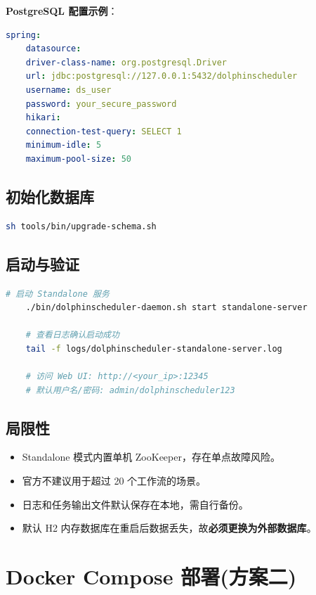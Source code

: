 \documentclass[UTF8, a4paper]{ctexbook}
\begin{document}
\textbf{PostgreSQL 配置示例}：
	
\begin{lstlisting}[language=yaml]
	spring:
	datasource:
	driver-class-name: org.postgresql.Driver
	url: jdbc:postgresql://127.0.0.1:5432/dolphinscheduler
	username: ds_user
	password: your_secure_password
	hikari:
	connection-test-query: SELECT 1
	minimum-idle: 5
	maximum-pool-size: 50
\end{lstlisting}
	
\section{初始化数据库}
	
\begin{lstlisting}[language=bash]
	sh tools/bin/upgrade-schema.sh
\end{lstlisting}
	
\section{启动与验证}
	
\begin{lstlisting}[language=bash]
	# 启动 Standalone 服务
	./bin/dolphinscheduler-daemon.sh start standalone-server
	
	# 查看日志确认启动成功
	tail -f logs/dolphinscheduler-standalone-server.log
	
	# 访问 Web UI: http://<your_ip>:12345
	# 默认用户名/密码: admin/dolphinscheduler123
\end{lstlisting}
	
\section{局限性}
	
\begin{itemize}
	\item Standalone 模式内置单机 ZooKeeper，存在单点故障风险。
	\item 官方不建议用于超过 20 个工作流的场景。
	\item 日志和任务输出文件默认保存在本地，需自行备份。
	\item 默认 H2 内存数据库在重启后数据丢失，故\textbf{必须更换为外部数据库}。
\end{itemize}
	
\chapter{Docker Compose 部署(方案二)}
	
\end{document}
